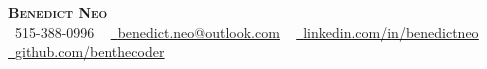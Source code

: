 \begin{center}
    \textbf{\Huge \scshape Benedict Neo} \\ \vspace{10pt}
    \small \raisebox{-0.2\height}\faPhone\ 515-388-0996  ~ 
    \href{mailto:benedict.neo@outlook.com}{\raisebox{-0.2\height}\faEnvelope\  \underline{benedict.neo@outlook.com}} ~ 
    \href{https://www.linkedin.com/in/benedictneo/}{\raisebox{-0.2\height}\faLinkedin\ \underline{linkedin.com/in/benedictneo}}  ~
    \href{https://github.com/benthecoder/}{\raisebox{-0.2\height}\faGithub\ \underline{github.com/benthecoder}}
    \vspace{7pt}
\end{center}